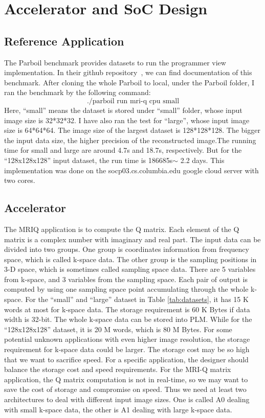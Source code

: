 \section{Accelerator and SoC Design}

\subsection{Reference Application}

The Parboil benchmark provides datasets to run the programmer view
implementation. In their github repository~\cite{esp-release}, we can find
documentation of this benchmark. After cloning the whole Parboil to local, under
the Parboil folder, I ran the benchmark by the following command:
$$\text{./parboil run mri-q cpu small}$$ Here, ``small'' means the dataset is
stored under ``small'' folder, whose input image size is 32*32*32. I have also
ran the test for ``large'', whose input image size is 64*64*64. The image size of
the largest dataset is 128*128*128.  The bigger the input data size, the higher
precision of the reconstructed image.The running time for small and large are
around 4.7s and 18.7s, respectively. But for the ``128x128x128'' input dataset,
the run time is 186685s$ \sim$ 2.2 days. This implementation was done on the
socp03.cs.columbia.edu google cloud server with two cores.

\subsection{Accelerator}

The MRIQ application is to compute the Q matrix. Each element of the Q matrix is
a complex number with imaginary and real part. The input data can be divided
into two groups. One group is coordinates information from frequency space,
which is called k-space data. The other group is the sampling positions in 3-D
space, which is sometimes called sampling space data. There are 5 variables from
k-space, and 3 variables from the sampling space. Each pair of output is
computed by using one sampling space point accumulating through the whole
k-space. For the ``small'' and ``large'' dataset in Table \ref{tab:datasets}, it has 15
K words at most for k-space data. The storage requirement is 60 K Bytes if data
width is 32-bit. The whole k-space data can be stored into PLM. While for the
``128x128x128'' dataset, it is 20 M words, which is 80 M Bytes. For some potential
unknown applications with even higher image resolution, the storage requirement
for k-space data could be larger. The storage cost may be so high that we want
to sacrifice speed. For a specific application, the designer should balance the
storage cost and speed requirements. For the MRI-Q matrix application, the Q
matrix computation is not in real-time, so we may want to save the cost of
storage and compromise on speed. Thus we need at least two architectures to deal
with different input image sizes. One is called A0 dealing with small k-space
data, the other is A1 dealing with large k-space data.\\



